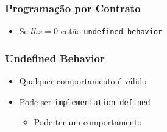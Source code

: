 \documentclass[14pt]{beamer}
\begin{document}
\frame
{
  \frametitle{Programação por Contrato}

  \usebox{\listingboxe}

  \begin{itemize}
  \item Se $lhs = 0$ então \texttt{undefined behavior}
  \end{itemize}
}

\frame
{
  \frametitle{Undefined Behavior}

  \begin{itemize}
  \item \alert<1>{Qualquer} comportamento é válido
  \item<2-> Pode ser \texttt{implementation defined}
    \begin{itemize}
    \item<3-> Pode ter um comportamento
    \end{itemize}
  \end{itemize}
}
\end{document}
